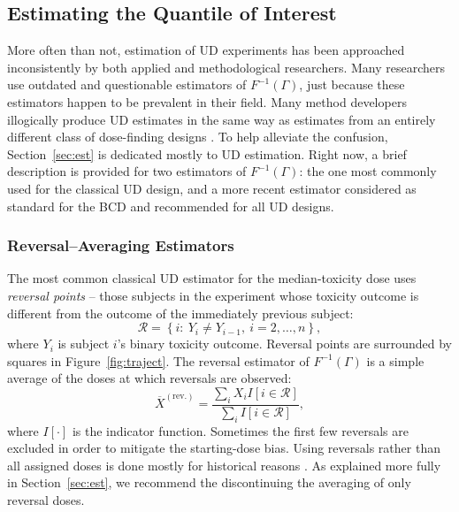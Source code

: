 \subsection{Estimating the Quantile of Interest}

More often than not, estimation of UD experiments has been approached inconsistently by both applied and methodological researchers. Many researchers use outdated and questionable estimators of $F^{-1}(\Gamma)$, just because these estimators happen to be prevalent in their field. Many method developers illogically produce  UD estimates  in the same way as estimates from an entirely different class of dose-finding designs \cite[e.g.,][]{Zack:stag:2009}. To help alleviate the confusion, Section~\ref{sec:est} is dedicated mostly to UD estimation. Right now, a brief description is provided for two  estimators of $F^{-1}(\Gamma)$: the one most commonly used for the classical UD design, and a more recent estimator considered as standard for the BCD and recommended for all UD designs.

\subsubsection{Reversal--Averaging Estimators}

The most common classical UD estimator for the median-toxicity dose uses \emph{reversal points} -- those subjects in the experiment whose toxicity outcome is different from the outcome of the immediately previous subject:
%
\begin{equation}\label{eq:reversal}
\mathcal{R}=\left\{i:\ Y_i\neq Y_{i-1},\ i=2,\ldots ,n\right\},
\end{equation}
where $Y_i$ is subject $i$'s binary toxicity outcome. Reversal points are surrounded by squares in Figure~\ref{fig:traject}. The reversal estimator of $F^{-1}(\Gamma)$ is a simple average of the doses at which reversals are observed:
\begin{equation}\label{eq:reversav}
\overline{X}^{\mathrm{(rev.)}}=\frac{\sum_iX_iI\left[i\in\mathcal{R}\right]}{\sum_iI\left[i\in\mathcal{R}\right]},
\end{equation}
\noindent where $I[\cdot]$ is the indicator function. Sometimes the first few reversals are excluded in order to mitigate the starting-dose bias. Using reversals rather than all assigned doses is done mostly for historical reasons \citep{Weth:Chen:Vasu:est:1966}. As explained more fully in Section~\ref{sec:est}, we recommend the discontinuing  the averaging of only reversal doses.

